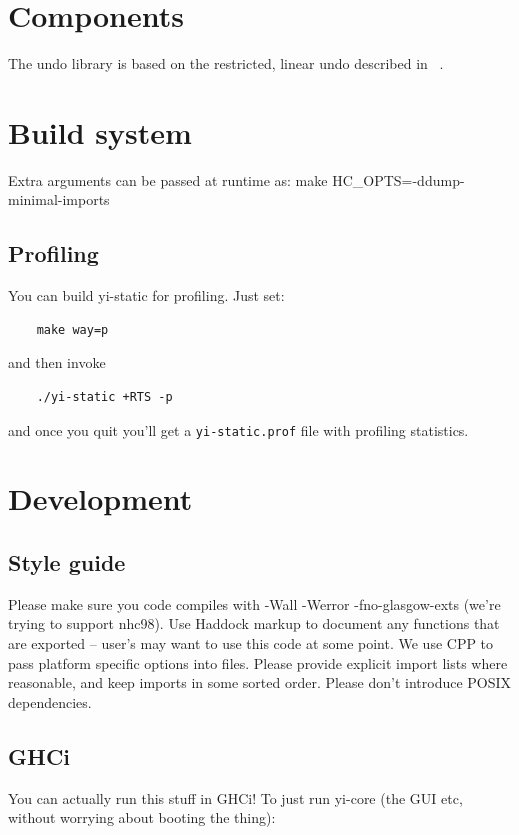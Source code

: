 \documentclass[]{article}
\newcommand{\code}[1]{\texttt{#1}}
\begin{document}
\section{Components}

The undo library is based on the restricted, linear undo described in
~\cite{berlage94selective}.

\section{Build system}

Extra arguments can be passed at runtime as: make HC\_OPTS=-ddump-minimal-imports

\subsection{Profiling}

You can build yi-static for profiling. Just set:
\begin{verbatim}
    make way=p
\end{verbatim}
and then invoke
\begin{verbatim}
    ./yi-static +RTS -p
\end{verbatim}
and once you quit you'll get a \code{yi-static.prof} file with profiling
statistics.

\section{Development}

\subsection{Style guide}

Please make sure you code compiles with -Wall -Werror -fno-glasgow-exts
(we're trying to support nhc98). Use Haddock markup to document any
functions that are exported -- user's may want to use this code at some
point. We use CPP to pass platform specific options into files. Please
provide explicit import lists where reasonable, and keep imports in some
sorted order. Please don't introduce POSIX dependencies.

\subsection{GHCi}

You can actually run this stuff in GHCi! To just run yi-core (the GUI
etc, without worrying about booting the thing):
\end{document}
